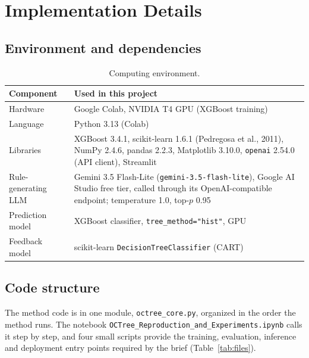 \documentclass[11pt]{article}
\newcommand{\code}[1]{\texttt{#1}}
\begin{document}
\section{Implementation Details}\label{sec:impl}

\subsection{Environment and dependencies}
\begin{table}[H]
\centering
\caption{Computing environment.}
\label{tab:env}
\begin{tabularx}{\linewidth}{@{}lX@{}}
\toprule
Component & Used in this project \\
\midrule
Hardware & Google Colab, NVIDIA T4 GPU (XGBoost training) \\
Language & Python 3.13 (Colab) \\
Libraries & XGBoost 3.4.1, scikit-learn 1.6.1 (Pedregosa et al., 2011), NumPy 2.4.6, pandas 2.2.3, Matplotlib 3.10.0, \code{openai} 2.54.0 (API client), Streamlit \\
Rule-generating LLM & Gemini 3.5 Flash-Lite (\code{gemini-3.5-flash-lite}), Google AI Studio free tier, called through its OpenAI-compatible endpoint; temperature 1.0, top-$p$ 0.95 \\
Prediction model & XGBoost classifier, \code{tree\_method="hist"}, GPU \\
Feedback model & scikit-learn \code{DecisionTreeClassifier} (CART) \\
\bottomrule
\end{tabularx}
\end{table}

\subsection{Code structure}
The method code is in one module, \code{octree\_core.py}, organized in the order the method runs. The
notebook \code{OCTree\_Reproduction\_and\_Experiments.ipynb} calls it step by step, and four small
scripts provide the training, evaluation, inference and deployment entry points required by the
brief (Table~\ref{tab:files}).
\end{document}
